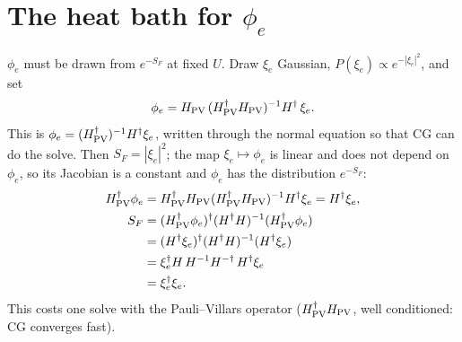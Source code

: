 \documentclass[11pt,a4paper]{article}
\numberwithin{equation}{section}
\newcommand{\dg}{^{\dagger}}
\begin{document}
\section{The heat bath for $\phi_e$}
$\phi_e$ must be drawn from $e^{-S_F}$ at fixed $U$. Draw $\xi_e$ Gaussian, $P(\xi_e)\propto
e^{-|\xi_e|^2}$, and set
\begin{equation}
\phi_e=H_{\rm PV}\,(H_{\rm PV}\dg H_{\rm PV})^{-1}H\dg\,\xi_e .
\end{equation}
This is $\phi_e=(H_{\rm PV}\dg)^{-1}H\dg\xi_e$, written through the normal equation so that CG
can do the solve. Then $S_F=|\xi_e|^2$; the map $\xi_e\mapsto\phi_e$ is linear and does not depend
on $\phi_e$, so its Jacobian is a constant and $\phi_e$ has the distribution $e^{-S_F}$:
\begin{align}
H_{\rm PV}\dg\phi_e&=H_{\rm PV}\dg H_{\rm PV}(H_{\rm PV}\dg H_{\rm PV})^{-1}H\dg\xi_e=H\dg\xi_e,\nonumber\\
S_F&=(H_{\rm PV}\dg\phi_e)\dg(H\dg H)^{-1}(H_{\rm PV}\dg\phi_e)\nonumber\\
&=(H\dg\xi_e)\dg(H\dg H)^{-1}(H\dg\xi_e)\nonumber\\
&=\xi_e\dg H\,H^{-1}H^{-\dagger}\,H\dg\xi_e\nonumber\\
&=\xi_e\dg\xi_e .
\end{align}
This costs one solve with the Pauli--Villars operator ($H_{\rm PV}\dg H_{\rm PV}$, well conditioned:
CG converges fast).
\end{document}
